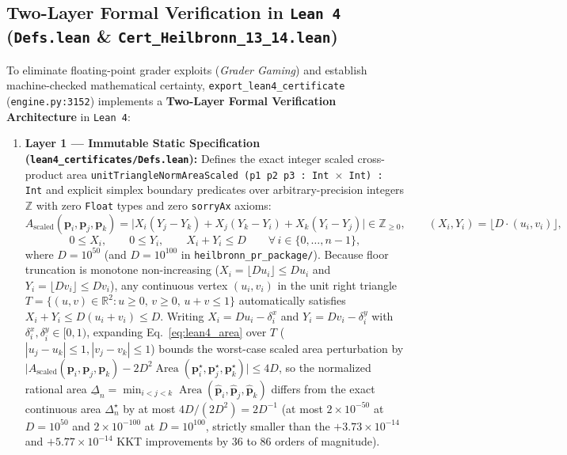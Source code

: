 \documentclass[11pt,a4paper]{article}
\begin{document}
\subsection{Two-Layer Formal Verification in \texttt{Lean 4} (\texttt{Defs.lean} \& \texttt{Cert\_Heilbronn\_13\_14.lean})}

To eliminate floating-point grader exploits (\emph{Grader Gaming}) and establish machine-checked mathematical certainty, \texttt{export\_lean4\_certificate} (\texttt{engine.py:3152}) implements a \textbf{Two-Layer Formal Verification Architecture} in \texttt{Lean 4}:
\begin{enumerate}
\item \textbf{Layer 1 --- Immutable Static Specification (\texttt{lean4\_certificates/Defs.lean}):} Defines the exact integer scaled cross-product area \texttt{unitTriangleNormAreaScaled (p1 p2 p3 : Int $\times$ Int) : Int} and explicit simplex boundary predicates over arbitrary-precision integers $\mathbb{Z}$ with zero \texttt{Float} types and zero \texttt{sorryAx} axioms:
\begin{equation}
A_{\text{scaled}}(\mathbf{p}_i, \mathbf{p}_j, \mathbf{p}_k) = \bigl|X_i(Y_j - Y_k) + X_j(Y_k - Y_i) + X_k(Y_i - Y_j)\bigr| \in \mathbb{Z}_{\ge 0}, \qquad (X_i, Y_i) = \lfloor D \cdot (u_i, v_i) \rfloor,
\tag{8a}\label{eq:lean4_area}
\end{equation}
\begin{equation}
0 \le X_i, \qquad 0 \le Y_i, \qquad X_i + Y_i \le D \qquad \forall\, i \in \{0, \dots, n-1\},
\tag{8b}\label{eq:lean4_simplex}
\end{equation}
where $D = 10^{50}$ (and $D = 10^{100}$ in \texttt{heilbronn\_pr\_package/}). Because floor truncation is monotone non-increasing ($X_i = \lfloor D u_i \rfloor \le D u_i$ and $Y_i = \lfloor D v_i \rfloor \le D v_i$), any continuous vertex $(u_i, v_i)$ in the unit right triangle $T = \{(u, v) \in \mathbb{R}^2 : u \ge 0,\, v \ge 0,\, u + v \le 1\}$ automatically satisfies $X_i + Y_i \le D(u_i + v_i) \le D$. Writing $X_i = D u_i - \delta_i^x$ and $Y_i = D v_i - \delta_i^y$ with $\delta_i^x, \delta_i^y \in [0, 1)$, expanding Eq.~\eqref{eq:lean4_area} over $T$ ($|u_j - u_k| \le 1, |v_j - v_k| \le 1$) bounds the worst-case scaled area perturbation by $\bigl|A_{\text{scaled}}(\mathbf{p}_i, \mathbf{p}_j, \mathbf{p}_k) - 2 D^2 \operatorname{Area}(\mathbf{p}_i^\star, \mathbf{p}_j^\star, \mathbf{p}_k^\star)\bigr| \le 4 D$, so the normalized rational area $\underline{\Delta}_n = \min_{i<j<k} \operatorname{Area}(\hat{\mathbf{p}}_i, \hat{\mathbf{p}}_j, \hat{\mathbf{p}}_k)$ differs from the exact continuous area $\Delta_n^\star$ by at most $4 D / (2 D^2) = 2 D^{-1}$ (at most $2 \times 10^{-50}$ at $D = 10^{50}$ and $2 \times 10^{-100}$ at $D = 10^{100}$, strictly smaller than the $+3.73 \times 10^{-14}$ and $+5.77 \times 10^{-14}$ KKT improvements by 36 to 86 orders of magnitude).

\end{enumerate}
\end{document}
